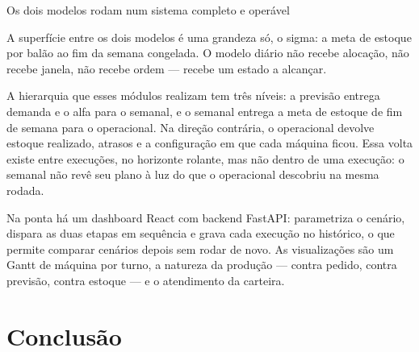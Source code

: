 \documentclass[11pt,aspectratio=169]{beamer}
\begin{document}
\begin{frame}{Os dois modelos rodam num sistema completo e operável}
{  A superfície entre os dois modelos é uma grandeza só, o sigma: a meta de estoque por balão ao
  fim da semana congelada. O modelo diário não recebe alocação, não recebe janela, não recebe
  ordem — recebe um estado a alcançar.

  A hierarquia que esses módulos realizam tem três níveis: a previsão entrega demanda e o alfa
  para o semanal, e o semanal entrega a meta de estoque de fim de semana para o operacional. Na
  direção contrária, o operacional devolve estoque realizado, atrasos e a configuração em que
  cada máquina ficou. Essa volta existe entre execuções, no horizonte rolante, mas não dentro de
  uma execução: o semanal não revê seu plano à luz do que o operacional descobriu na mesma rodada.

  Na ponta há um dashboard React com backend FastAPI: parametriza o cenário, dispara as duas
  etapas em sequência e grava cada execução no histórico, o que permite comparar cenários depois
  sem rodar de novo. As visualizações são um Gantt de máquina por turno, a natureza da produção —
  contra pedido, contra previsão, contra estoque — e o atendimento da carteira.}
\end{frame}

\section{Conclusão}
\end{document}

